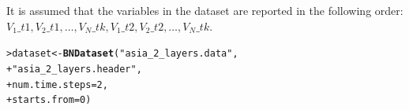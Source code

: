 \documentclass{article}\usepackage[]{graphicx}\usepackage[]{color}
\makeatletter
\newcommand{\hlnum}[1]{\textcolor[rgb]{0.686,0.059,0.569}{#1}}%
\newcommand{\hlstr}[1]{\textcolor[rgb]{0.192,0.494,0.8}{#1}}%
\newcommand{\hlstd}[1]{\textcolor[rgb]{0.345,0.345,0.345}{#1}}%
\newcommand{\hlkwb}[1]{\textcolor[rgb]{0.69,0.353,0.396}{#1}}%
\newcommand{\hlkwc}[1]{\textcolor[rgb]{0.333,0.667,0.333}{#1}}%
\newcommand{\hlkwd}[1]{\textcolor[rgb]{0.737,0.353,0.396}{\textbf{#1}}}%
\newenvironment{kframe}{%
 \def\at@end@of@kframe{}%
 \ifinner\ifhmode%
  \def\at@end@of@kframe{\end{minipage}}%
  \begin{minipage}{\columnwidth}%
 \fi\fi%
 \def\FrameCommand##1{\hskip\@totalleftmargin \hskip-\fboxsep
 \colorbox{shadecolor}{##1}\hskip-\fboxsep
     \hskip-\linewidth \hskip-\@totalleftmargin \hskip\columnwidth}%
 \MakeFramed {\advance\hsize-\width
   \@totalleftmargin\z@ \linewidth\hsize
   \@setminipage}}%
 {\par\unskip\endMakeFramed%
 \at@end@of@kframe}
\newenvironment{knitrout}{}{} %
\newcommand{\Robject}[1]{{\texttt{#1}}}
\newcommand{\Rmethod}[1]{{\texttt{#1}}}
\newcommand{\Rclass}[1]{{\textit{#1}}}
\makeatother
\begin{document}
It is assumed that the variables in the dataset are reported in the following order: 
$V_1\_t1, V_2\_t1, \dots, V_N\_tk, V_1\_t2, V_2\_t2, \dots, V_N\_tk$.

\begin{knitrout}
\color{fgcolor}\begin{kframe}
\begin{alltt}
\hlstd{> }\hlstd{dataset} \hlkwb{<-} \hlkwd{BNDataset}\hlstd{(}\hlstr{"asia_2_layers.data"}\hlstd{,}
\hlstd{+ }                     \hlstr{"asia_2_layers.header"}\hlstd{,}
\hlstd{+ }                     \hlkwc{num.time.steps} \hlstd{=} \hlnum{2}\hlstd{,}
\hlstd{+ }                     \hlkwc{starts.from} \hlstd{=} \hlnum{0}\hlstd{)}
\end{alltt}
\end{kframe}
\end{knitrout}


% 
% 
% 
% 
% 
\end{document}
